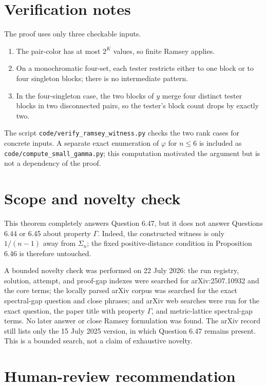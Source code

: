 \documentclass[11pt]{article}
\newcommand{\ph}{\varphi}
\begin{document}
\section{Verification notes}

The proof uses only three checkable inputs.
\begin{enumerate}
  \item The pair-color has at most $2^K$ values, so finite Ramsey applies.
  \item On a monochromatic four-set, each tester restricts either to one block
  or to four singleton blocks; there is no intermediate pattern.
  \item In the four-singleton case, the two blocks of $y$ merge four distinct
  tester blocks in two disconnected pairs, so the tester's block count drops
  by exactly two.
\end{enumerate}
The script \texttt{code/verify\_ramsey\_witness.py} checks the two rank cases
for concrete inputs.  A separate exact enumeration of $\ph$ for $n\le6$ is
included as \texttt{code/compute\_small\_gamma.py}; this computation motivated
the argument but is not a dependency of the proof.

\section{Scope and novelty check}

This theorem completely answers Question 6.47, but it does not answer Questions
6.44 or 6.45 about property $\Gamma$.  Indeed, the constructed witness is only
$1/(n-1)$ away from $\Sigma_n$; the fixed positive-distance condition in
Proposition 6.46 is therefore untouched.

A bounded novelty check was performed on 22 July 2026: the run registry,
solution, attempt, and proof-gap indexes were searched for arXiv:2507.10932 and
the core terms; the locally parsed arXiv corpus was searched for the exact
spectral-gap question and close phrases; and arXiv web searches were run for
the exact question, the paper title with property $\Gamma$, and metric-lattice
spectral-gap terms.  No later answer or close Ramsey formulation was found.
The arXiv record still lists only the 15 July 2025 version, in which Question
6.47 remains present.  This is a bounded search, not a claim of exhaustive
novelty.

\section{Human-review recommendation}
\end{document}
